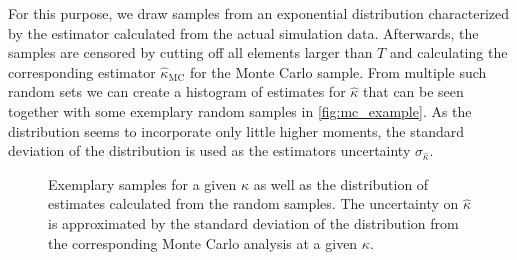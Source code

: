 For this purpose, we draw samples from an exponential distribution characterized by the estimator calculated from the actual simulation data. Afterwards, the samples are censored by cutting off all elements larger than $T$ and calculating the corresponding estimator $\hat{\kappa}_{\text{MC}}$ for the Monte Carlo sample. From multiple such random sets we can create a histogram of estimates for $\hat{\kappa}$ that can be seen together with some exemplary random samples in \autoref{fig:mc_example}. As the distribution seems to incorporate only little higher moments, the standard deviation of the distribution is used as the estimators uncertainty $\sigma_{\hat{\kappa}}$.\\
\begin{figure}[ht]
 \hspace{0.5cm}
\caption[Monte Carlo uncertainty estimation example]{Exemplary samples for a given $\kappa$ as well as the distribution of estimates calculated from the random samples. The uncertainty on $\hat{\kappa}$ is approximated by the standard deviation of the distribution from the corresponding Monte Carlo analysis at a given $\kappa$.}
\label{fig:mc_example}
\end{figure}

